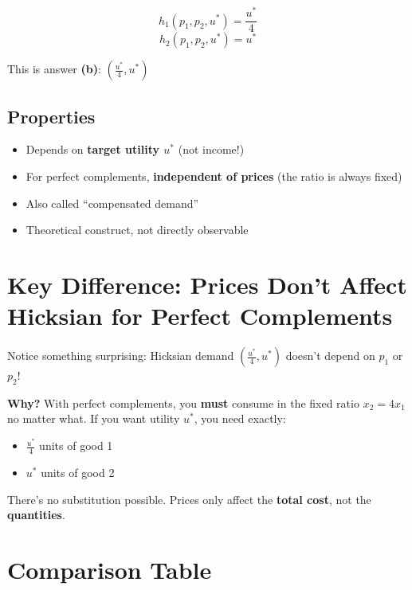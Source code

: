 \documentclass[11pt]{article}
\begin{document}
\[
\boxed{h_1(p_1, p_2, u^*) = \frac{u^*}{4}}
\]
\[
\boxed{h_2(p_1, p_2, u^*) = u^*}
\]

This is answer \textbf{(b)}: $\left(\frac{u^*}{4}, u^*\right)$

\subsection{Properties}

\begin{itemize}
    \item Depends on \textbf{target utility $u^*$} (not income!)
    \item For perfect complements, \textbf{independent of prices} (the ratio is always fixed)
    \item Also called ``compensated demand''
    \item Theoretical construct, not directly observable
\end{itemize}

\section{Key Difference: Prices Don't Affect Hicksian for Perfect Complements}

Notice something surprising: Hicksian demand $\left(\frac{u^*}{4}, u^*\right)$ doesn't depend on $p_1$ or $p_2$!

\textbf{Why?} With perfect complements, you \textbf{must} consume in the fixed ratio $x_2 = 4x_1$ no matter what. If you want utility $u^*$, you need exactly:
\begin{itemize}
    \item $\frac{u^*}{4}$ units of good 1
    \item $u^*$ units of good 2
\end{itemize}

There's no substitution possible. Prices only affect the \textbf{total cost}, not the \textbf{quantities}.

\section{Comparison Table}
\end{document}
